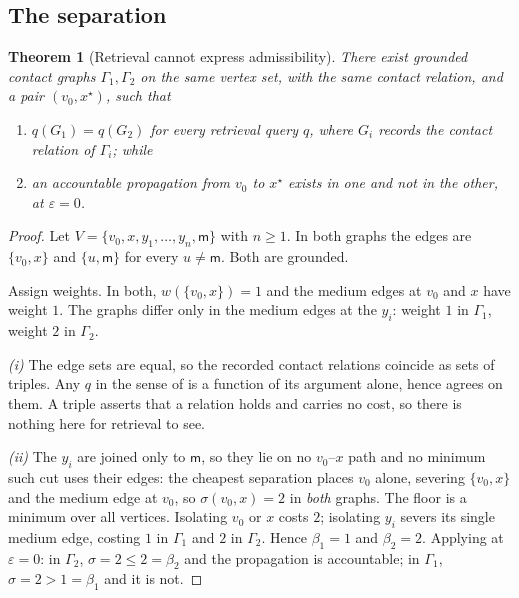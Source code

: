 \documentclass[11pt,twocolumn,a4paper]{article}
\theoremstyle{thmstyle}
\newtheorem{theorem}{Theorem}[section]
\theoremstyle{definition}
\theoremstyle{remark}
\newcommand{\Gph}{\Gamma}
\newcommand{\med}{\mathsf{m}}
\newcommand{\flo}{\beta}
\newcommand{\sepc}{\sigma}
\begin{document}
\subsection{The separation}

\begin{theorem}[Retrieval cannot express admissibility]
\label{thm:separation}
There exist grounded contact graphs $\Gph_1, \Gph_2$ on the same vertex set,
with the same contact relation, and a pair $(v_0,x^\star)$, such that
\begin{enumerate}[label=(\roman*),leftmargin=2.2em]
\item $q(G_1)=q(G_2)$ for every retrieval query $q$, where $G_i$ records the
      contact relation of $\Gph_i$; while
\item an accountable propagation from $v_0$ to $x^\star$ exists in one and not
      in the other, at $\varepsilon=0$.
\end{enumerate}
\end{theorem}

\begin{proof}
Let $V=\{v_0,x,y_1,\dots,y_n,\med\}$ with $n \geq 1$. In both graphs the edges
are $\{v_0,x\}$ and $\{u,\med\}$ for every $u \neq \med$. Both are grounded.

Assign weights. In both, $w(\{v_0,x\})=1$ and the medium edges at $v_0$ and
$x$ have weight $1$. The graphs differ only in the medium edges at the $y_i$:
weight $1$ in $\Gph_1$, weight $2$ in $\Gph_2$.

\emph{(i)} The edge sets are equal, so the recorded contact relations coincide
as sets of triples. Any $q$ in the sense of  is a function
of its argument alone, hence agrees on them. A triple asserts that a relation
holds and carries no cost, so there is nothing here for retrieval to see.

\emph{(ii)} The $y_i$ are joined only to $\med$, so they lie on no
$v_0$--$x$ path and no minimum such cut uses their edges: the cheapest
separation places $v_0$ alone, severing $\{v_0,x\}$ and the medium edge at
$v_0$, so $\sepc(v_0,x)=2$ in \emph{both} graphs. The floor is a minimum over
all vertices. Isolating $v_0$ or $x$ costs $2$; isolating $y_i$ severs its
single medium edge, costing $1$ in $\Gph_1$ and $2$ in $\Gph_2$. Hence
$\flo_1 = 1$ and $\flo_2 = 2$. Applying  at
$\varepsilon=0$: in $\Gph_2$, $\sepc = 2 \leq 2 = \flo_2$ and the propagation
is accountable; in $\Gph_1$, $\sepc = 2 > 1 = \flo_1$ and it is not.
\end{proof}
\end{document}
